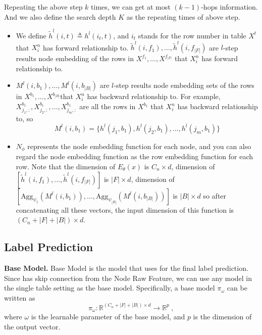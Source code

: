 Repeating the above step $k$ times, we can get at most $(k-1)$-hops information. And we also define the search depth $K$ as the repeating times of above step.
\begin{itemize}[leftmargin=*]
\item We define $\tilde{h}^{l}(i, t)\triangleq h^l(i_t, t)$, and $i_t$ stands for the row number in table $X^t$ that $X^{n}_i$ has forward relationship to. $\tilde{h}^{l}(i, f_1), \ldots, \tilde{h}^{l}(i, f_{|F|})$ are $l$-step results node embedding of the rows in $X^{f_1},\ldots,X^{f_{|F|}}$ that $X^{n}_i$ has forward relationship to. 
\item $M^{l}(i, b_1),\ldots,M^{l}(i, b_{|B|})$ are $l$-step results node embedding sets of the rows in $X^{b_1},\ldots,X^{b_{|B|}}$that $X^{n}_i$ has backward relationship to. For example, $X^{b_1}_{j_1, :}, X^{b_1}_{j_2, :},\ldots,X^{b_1}_{j_m, :}$ are all the rows in $X^{b_1}$ that $X^{n}_i$ has backward relationship to, so $$M^{l}(i, b_1)=\{h^{l}(j_1, b_1), h^{l}(j_2, b_1), \ldots , h^{l}(j_m, b_1)\}$$
\item $N_\phi$ represents the node embedding function for each node, and you can also regard the node embedding function as the row embedding function for each row. Note that the dimension of $E_\theta(x)$ is $C_n\times d$, dimension of $[\tilde{h}^{l}(i, f_1), \ldots, \tilde{h}^{l}(i, f_{|F|})]$ is $|F|\times d$, dimension of $[\text{Agg}_{\psi_1}(M^{l}(i, b_1)), \ldots,\text{Agg}_{\psi_{|B|}}(M^{l}(i, b_{|B|}))]$ is $|B|\times d$ so after concatenating all these vectors, the input dimension of this function is $(C_n+|F|+|B|)\times d$.
\end{itemize}

\subsection{Label Prediction}\label{sec:label_prediction}
\header
\textbf{Base Model.}
Base Model is the model that \model{} uses for the final label prediction. Since \model{} has skip connection from the Node Raw Feature, we can use any model in the single table setting as the base model. Specifically, a base model $\pi_{\omega}$ can be written as
\begin{equation}
    \pi_{\omega}: \mathbb{R}^{(C_n+|F|+|B|)\times d} \rightarrow \mathbb{R}^{p}~,
\end{equation}
where $\omega$ is the learnable parameter of the base model, and $p$ is the dimension of the output vector.

